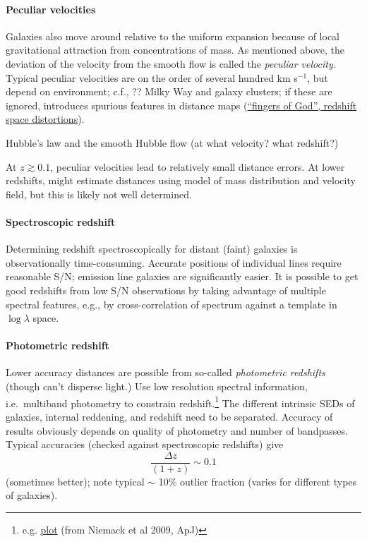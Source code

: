 \documentclass{article}
\newcommand{\mynotes}[1]{\textcolor{cadmiumgreen}{#1}}
\begin{document}
\paragraph{Peculiar velocities}
Galaxies also move around relative to the uniform expansion because of local
gravitational attraction from concentrations of mass.
As mentioned above, the deviation of the
velocity from the smooth flow is called the \textit{peculiar velocity}.
Typical peculiar velocities are on the order of several hundred km s$^{-1}$,
but depend on environment; c.f., \mynotes{??}
Milky Way and galaxy clusters; if these are ignored, introduces spurious
features in distance maps
(\href{http://astronomy.nmsu.edu/holtz/a555/resources/cfa.html}
{``fingers of God'', redshift space distortions}).

Hubble's law and the smooth Hubble flow (at what velocity? what redshift?)

At $z \gtrsim 0.1$, peculiar velocities lead to relatively small distance
errors. At lower redshifts, might estimate distances using model of mass
distribution and velocity field, but this is likely not well determined.

\paragraph{Spectroscopic redshift}
Determining redshift spectroscopically for distant (faint) galaxies is
observationally time-consuming. Accurate positions of individual lines
require reasonable S/N; emission line galaxies are significantly easier.
It is possible to get good redshifts from low
S/N observations by taking advantage of multiple spectral features,
e.g., by cross-correlation of spectrum against a template
in $\log\lambda$ space.

\paragraph{Photometric redshift}
Lower accuracy distances are possible from so-called \textit{photometric
redshifts} \mynotes{(though can't disperse light.)}
Use low resolution spectral
information, i.e.\ multiband photometry to constrain redshift.\footnote{
    e.g. \href{http://astronomy.nmsu.edu/holtz/a555/resources/photoz.png}
    {plot} (from Niemack et al 2009, ApJ)}
The different intrinsic SEDs of galaxies, internal reddening, and
redshift need to be separated.
Accuracy of results obviously depends on quality of photometry
and number of bandpasses. Typical accuracies (checked against spectroscopic
redshifts) give
\[
    \frac{\Delta{z}}{\left(1+z\right)} \sim 0.1
    \]
(sometimes better); note typical $\sim$ 10\% outlier fraction
(varies for different types of galaxies).
\end{document}

